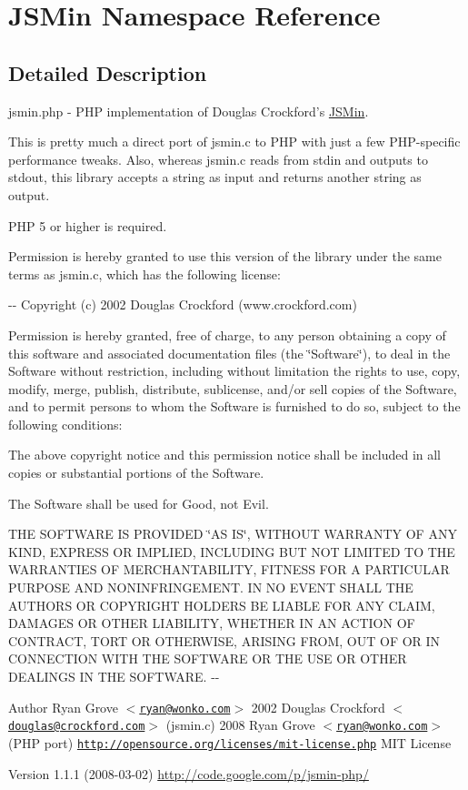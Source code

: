\hypertarget{namespace_j_s_min}{
\section{JSMin Namespace Reference}
\label{namespace_j_s_min}
}


\subsection{Detailed Description}
jsmin.php -\/ PHP implementation of Douglas Crockford's \hyperlink{class_j_s_min}{JSMin}.

This is pretty much a direct port of jsmin.c to PHP with just a few PHP-\/specific performance tweaks. Also, whereas jsmin.c reads from stdin and outputs to stdout, this library accepts a string as input and returns another string as output.

PHP 5 or higher is required.

Permission is hereby granted to use this version of the library under the same terms as jsmin.c, which has the following license:

-\/-\/ Copyright (c) 2002 Douglas Crockford (www.crockford.com)

Permission is hereby granted, free of charge, to any person obtaining a copy of this software and associated documentation files (the \char`\"{}Software\char`\"{}), to deal in the Software without restriction, including without limitation the rights to use, copy, modify, merge, publish, distribute, sublicense, and/or sell copies of the Software, and to permit persons to whom the Software is furnished to do so, subject to the following conditions:

The above copyright notice and this permission notice shall be included in all copies or substantial portions of the Software.

The Software shall be used for Good, not Evil.

THE SOFTWARE IS PROVIDED \char`\"{}AS IS\char`\"{}, WITHOUT WARRANTY OF ANY KIND, EXPRESS OR IMPLIED, INCLUDING BUT NOT LIMITED TO THE WARRANTIES OF MERCHANTABILITY, FITNESS FOR A PARTICULAR PURPOSE AND NONINFRINGEMENT. IN NO EVENT SHALL THE AUTHORS OR COPYRIGHT HOLDERS BE LIABLE FOR ANY CLAIM, DAMAGES OR OTHER LIABILITY, WHETHER IN AN ACTION OF CONTRACT, TORT OR OTHERWISE, ARISING FROM, OUT OF OR IN CONNECTION WITH THE SOFTWARE OR THE USE OR OTHER DEALINGS IN THE SOFTWARE. -\/-\/

\begin{DoxyAuthor}{Author}
Ryan Grove $<$\href{mailto:ryan@wonko.com}{\tt ryan@wonko.com}$>$  2002 Douglas Crockford $<$\href{mailto:douglas@crockford.com}{\tt douglas@crockford.com}$>$ (jsmin.c)  2008 Ryan Grove $<$\href{mailto:ryan@wonko.com}{\tt ryan@wonko.com}$>$ (PHP port)  \href{http://opensource.org/licenses/mit-license.php}{\tt http://opensource.org/licenses/mit-\/license.php} MIT License 
\end{DoxyAuthor}
\begin{DoxyVersion}{Version}
1.1.1 (2008-\/03-\/02) \hyperlink{}{http://code.google.com/p/jsmin-\/php/}
\end{DoxyVersion}

